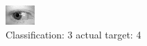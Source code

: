 \begin{figure}[h!]
\begin{center}
\includegraphics[width=0.60\columnwidth]{figures/ID772_class_3_target_4.png}
\end{center}
\caption{ Classification: 3 actual target: 4}
\label{fig:ID772_class_3_target_4}
\end{figure}

